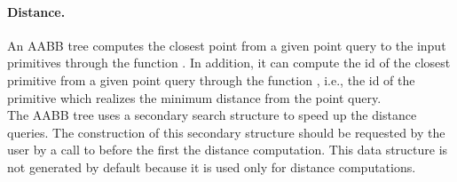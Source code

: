 \paragraph{Distance.} An AABB tree computes the closest point from a given point query to the input primitives through the function . In addition, it can compute the id of the closest primitive from a given point query through the function , i.e., the id of the primitive which realizes the minimum distance from the point query.\\ 

The AABB tree uses a secondary search structure to speed up the distance queries. The construction of this secondary structure should be requested by the user by a call to  before the first the distance computation. This data structure is not generated by default because it is used only for distance computations.


